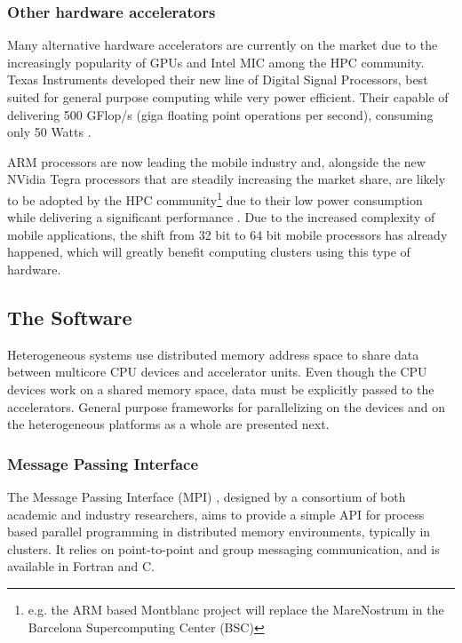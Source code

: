 \subsubsection*{Other hardware accelerators}
\label{other_accelerators}

Many alternative hardware accelerators are currently on the market due to the increasingly popularity of GPUs and Intel MIC among the HPC community. Texas Instruments developed their new line of Digital Signal Processors, best suited for general purpose computing while very power efficient. Their capable of delivering 500 GFlop/s (giga floating point operations per second), consuming only 50 Watts \cite{Texas:DSP}.

ARM processors are now leading the mobile industry and, alongside the new NVidia Tegra processors \cite{NVIDIA:Tegra} that are steadily increasing the market share, are likely to be adopted by the HPC community\footnote{e.g. the ARM based Montblanc project will replace the MareNostrum in the Barcelona Supercomputing Center (BSC)} due to their low power consumption while delivering a significant performance \cite{ARM}. Due to the increased complexity of mobile applications, the shift from 32 bit to 64 bit mobile processors has already happened, which will greatly benefit computing clusters using this type of hardware.

\subsection{The Software}
\label{distributed_mem}

Heterogeneous systems use distributed memory address space to share data between multicore CPU devices and accelerator units. Even though the CPU devices work on a shared memory space, data must be explicitly passed to the accelerators. General purpose frameworks for parallelizing on the devices and on the heterogeneous platforms as a whole are presented next.

\subsubsection*{Message Passing Interface}

The Message Passing Interface (MPI) \cite{MPI}, designed by a consortium of both academic and industry researchers, aims to provide a simple API for process based parallel programming in distributed memory environments, typically in clusters. It relies on point-to-point and group messaging communication, and is available in Fortran and C.

